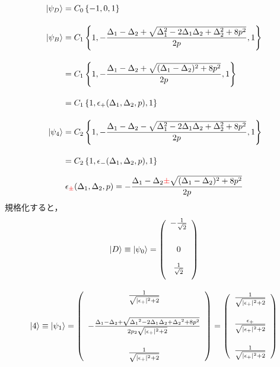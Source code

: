\begin{align}
    \ket{\psi_D}&=C_0\left\{-1,0,1\right\}\\[10pt]
    \ket{\psi_B}&=C_1\left\{1,-\frac{\Delta_1-\Delta_2+\sqrt{\Delta_1^2-2\Delta_1\Delta_2+\Delta_2^2+8p^2}}{2p},1\right\}\nn[10pt]
    &=C_1\left\{1,-\frac{{\Delta_{1}}-{\Delta_{2}}
    +\sqrt{({\Delta_{1}}-{\Delta_{2}})^2+8{p^2}}}{2{p}},1\right\}\nn[10pt]
    &=C_1\left\{1,
    \epsilon_+({\Delta_{1}},{\Delta_{2}},
    p)
    ,1\right\}\\[10pt]
    \ket{\psi_4}&=C_2\left\{1,-\frac{\Delta_1-\Delta_2-\sqrt{\Delta_1^2-2\Delta_1\Delta_2+\Delta_2^2+8p^2}}{2p},1\right\}\nn[10pt]
    &=C_2\left\{1,
    \epsilon_-({\Delta_{1}},{\Delta_{2}},
    p)
    ,1\right\}
\end{align}

\begin{align}
    \epsilon_{\textcolor{red}{\pm}}
    ({\Delta_{1}},{\Delta_{2}}, p)
    =-\frac{
    \Delta_{1}-\Delta_{2}
    {\textcolor{red}{\pm}}
    \sqrt{({\Delta_{1}}-{\Delta_{2}})^2+8{p^2}}
    }
    {2p}
\end{align}
規格化すると，
\begin{equation}
        \ket{D}\equiv\ket{\psi_0}=\left(
        \begin{array}{c}
       -\frac{1}{\sqrt{2}}\\[20pt]
       0\\[10pt]
       \frac{1}{\sqrt{2}}\\[10pt]
        \end{array}
        \right)
\end{equation}

\begin{equation}
     \ket{4}\equiv\ket{\psi_1}=\left(
        \begin{array}{c}
       \frac{1}{\sqrt{
       |\epsilon_{+}|^2
       +2}}\\[20pt]
       -\frac{{\Delta_1}-{\Delta_2}+\sqrt{{\Delta_1}^2-2{\Delta_1}{\Delta_2}+{\Delta_2}^2+8p^2}}{2{p_2}\sqrt{
       |\epsilon_{+}|^2+2}}\\[20pt]
       \frac{1}{\sqrt{
       |\epsilon_{+}|^2+2}}
        \end{array}
        \right)
        =\left(
        \begin{array}{c}
       \frac{1}{\sqrt{
       |\epsilon_{+}|^2
       +2}}\\[20pt]
       \frac{\epsilon_+}{
       \sqrt{
       |\epsilon_{+}|^2
       +2}}\\[20pt]
       \frac{1}{\sqrt{
       |\epsilon_{+}|^2
       +2}}
        \end{array}
        \right)
\end{equation}

